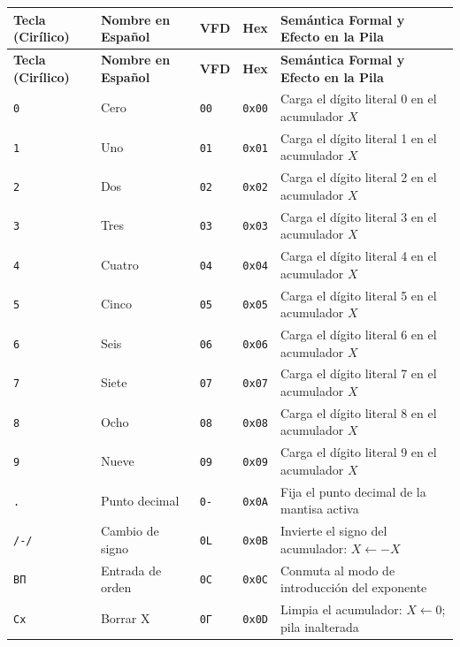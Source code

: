 \documentclass[11pt,a4paper]{article}
\begin{document}
{\small
\setlength{\tabcolsep}{4pt}
\begin{longtable}{p{2.2cm}p{3.0cm}>{\centering\arraybackslash}p{1.0cm}>{\centering\arraybackslash}p{1.2cm}p{7.3cm}}
\toprule
\textbf{Tecla (Cirílico)} & \textbf{Nombre en Español} & \textbf{VFD} & \textbf{Hex} & \textbf{Semántica Formal y Efecto en la Pila} \\
\midrule
\endfirsthead
\toprule
\textbf{Tecla (Cirílico)} & \textbf{Nombre en Español} & \textbf{VFD} & \textbf{Hex} & \textbf{Semántica Formal y Efecto en la Pila} \\
\midrule
\endhead
\bottomrule
\endfoot
\texttt{0} & Cero & \texttt{00} & \texttt{0x00} & Carga el dígito literal 0 en el acumulador $X$ \\
\texttt{1} & Uno & \texttt{01} & \texttt{0x01} & Carga el dígito literal 1 en el acumulador $X$ \\
\texttt{2} & Dos & \texttt{02} & \texttt{0x02} & Carga el dígito literal 2 en el acumulador $X$ \\
\texttt{3} & Tres & \texttt{03} & \texttt{0x03} & Carga el dígito literal 3 en el acumulador $X$ \\
\texttt{4} & Cuatro & \texttt{04} & \texttt{0x04} & Carga el dígito literal 4 en el acumulador $X$ \\
\texttt{5} & Cinco & \texttt{05} & \texttt{0x05} & Carga el dígito literal 5 en el acumulador $X$ \\
\texttt{6} & Seis & \texttt{06} & \texttt{0x06} & Carga el dígito literal 6 en el acumulador $X$ \\
\texttt{7} & Siete & \texttt{07} & \texttt{0x07} & Carga el dígito literal 7 en el acumulador $X$ \\
\texttt{8} & Ocho & \texttt{08} & \texttt{0x08} & Carga el dígito literal 8 en el acumulador $X$ \\
\texttt{9} & Nueve & \texttt{09} & \texttt{0x09} & Carga el dígito literal 9 en el acumulador $X$ \\
\texttt{.} & Punto decimal & \texttt{0-} & \texttt{0x0A} & Fija el punto decimal de la mantisa activa \\
\texttt{/-/} & Cambio de signo & \texttt{0L} & \texttt{0x0B} & Invierte el signo del acumulador: $X \leftarrow -X$ \\
\texttt{ВП} & Entrada de orden & \texttt{0C} & \texttt{0x0C} & Conmuta al modo de introducción del exponente \\
\texttt{Сх} & Borrar X & \texttt{0Г} & \texttt{0x0D} & Limpia el acumulador: $X \leftarrow 0$; pila inalterada \\

\end{longtable}}
\end{document}
